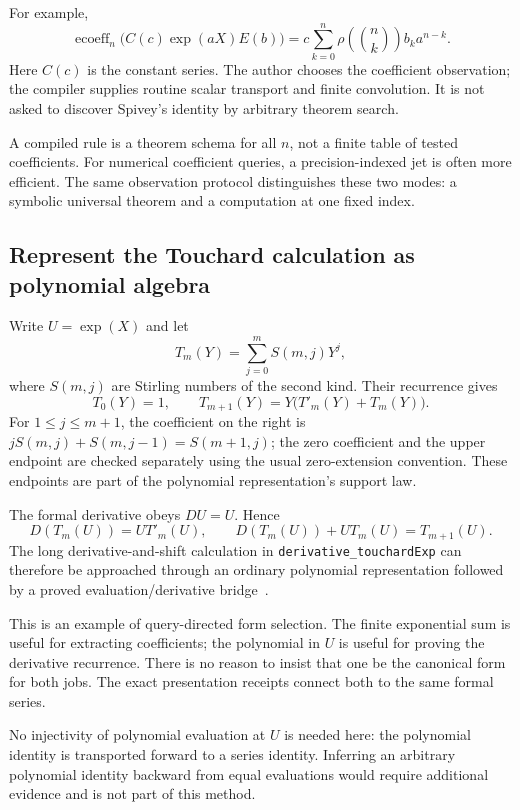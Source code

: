 \documentclass[11pt,a4paper]{article}
\newcommand{\code}[1]{\nolinkurl{#1}}
\newcommand{\ecoeff}{\operatorname{ecoeff}}
\theoremstyle{definition}
\begin{document}
For example,
\[
 \ecoeff_n\bigl(C(c)\exp(aX)E(b)\bigr)
   =c\sum_{k=0}^{n}\rho\!\left(\binom nk\right)b_k a^{n-k}.
\]
Here \(C(c)\) is the constant series. The author chooses the coefficient
observation; the compiler supplies routine scalar transport and finite
convolution. It is not asked to discover Spivey's identity by arbitrary theorem
search.

A compiled rule is a theorem schema for all \(n\), not a finite table of tested
coefficients. For numerical coefficient queries, a precision-indexed jet is often
more efficient. The same observation protocol distinguishes these two modes:
a symbolic universal theorem and a computation at one fixed index.

\subsection{Represent the Touchard calculation as polynomial algebra}
Write \(U=\exp(X)\) and let
\[
 T_m(Y)=\sum_{j=0}^{m}S(m,j)Y^j,
\]
where \(S(m,j)\) are Stirling numbers of the second kind. Their recurrence gives
\begin{equation}\label{eq:touchard}
 T_0(Y)=1,\qquad T_{m+1}(Y)=Y\bigl(T'_m(Y)+T_m(Y)\bigr).
\end{equation}
For \(1\leq j\leq m+1\), the coefficient on the right is
\(jS(m,j)+S(m,j-1)=S(m+1,j)\); the zero coefficient and the upper endpoint are
checked separately using the usual zero-extension convention. These endpoints
are part of the polynomial representation's support law.

The formal derivative obeys \(DU=U\). Hence
\[
 D(T_m(U))=U T'_m(U),
 \qquad D(T_m(U))+U T_m(U)=T_{m+1}(U).
\]
The long derivative-and-shift calculation in \code{derivative_touchardExp} can
therefore be approached through an ordinary polynomial representation followed
by a proved evaluation/derivative bridge~\cite{p-bell}.

This is an example of query-directed form selection. The finite exponential sum
is useful for extracting coefficients; the polynomial in \(U\) is useful for
proving the derivative recurrence. There is no reason to insist that one be the
canonical form for both jobs. The exact presentation receipts connect both to
the same formal series.

No injectivity of polynomial evaluation at \(U\) is needed here: the polynomial
identity is transported forward to a series identity. Inferring an arbitrary
polynomial identity backward from equal evaluations would require additional
evidence and is not part of this method.
\end{document}

